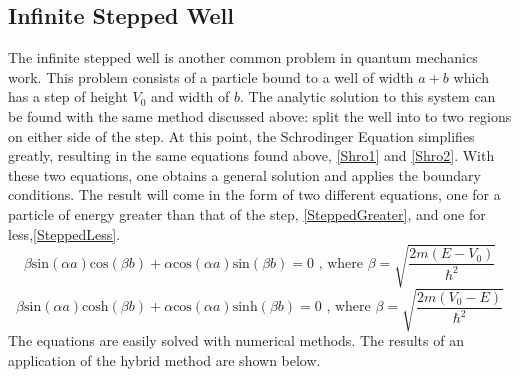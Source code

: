 \documentclass[12pt]{article}
\begin{document}
\subsection{Infinite Stepped Well}
The infinite stepped well is another common problem in quantum mechanics work.  This problem consists of a particle bound to a well of width $a+b$ which has a step of height $V_0$ and width of $b$.  The analytic solution to this system can be found with the same method discussed above:  split the well into to two regions on either side of the step.  At this point, the Schrodinger Equation simplifies greatly, resulting in the same equations found above, \eqref{Shro1} and \eqref{Shro2}.  With these two equations, one obtains a general solution and applies the boundary conditions.  The result will come in the form of two different equations, one for a particle of energy greater than that of the step, \eqref{SteppedGreater}, and one for less,\eqref{SteppedLess}.
\begin{equation}
\label{SteppedGreater}
\beta\text{sin}(\alpha a)\text{cos}(\beta b) + \alpha\text{cos}(\alpha a)\text{sin}(\beta b) = 0 \text{ , where } \beta=\sqrt{\frac{2m(E-V_0)}{\hbar^2}}
\end{equation}
\begin{equation}
\label{SteppedLess}
\beta\text{sin}(\alpha a)\text{cosh}(\beta b) + \alpha\text{cos}(\alpha a)\text{sinh}(\beta b) = 0 \text{ , where } \beta=\sqrt{\frac{2m(V_0-E)}{\hbar^2}}
\end{equation}
The equations are easily solved with numerical methods.  The results of an application of the hybrid method are shown below.
\end{document}
